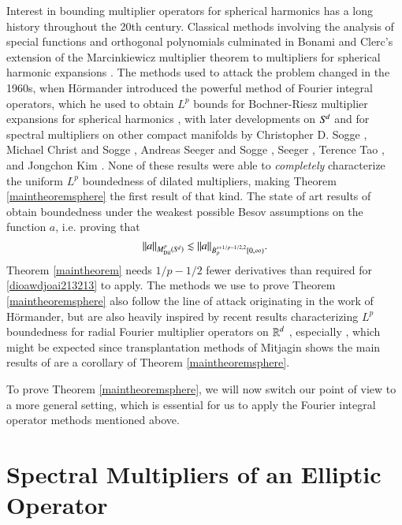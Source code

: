 Interest in bounding multiplier operators for spherical harmonics has a long history throughout the 20th century. Classical methods involving the analysis of special functions and orthogonal polynomials culminated in Bonami and Clerc's extension of the Marcinkiewicz multiplier theorem to multipliers for spherical harmonic expansions \cite{BonamiClerc}. The methods used to attack the problem changed in the 1960s, when H\"{o}rmander introduced the powerful method of Fourier integral operators, which he used to obtain $L^p$ bounds for Bochner-Riesz multiplier expansions for spherical harmonics \cite{HormanderRiesz}, with later developments on ${S}^{\!{d}}$ and for spectral multipliers on other compact manifolds by Christopher D. Sogge \cite{SoggeSpectralClusters,SoggeRieszMeans,SoggeSphericalHarmonics}, Michael Christ and Sogge \cite{ChristandSogge}, Andreas Seeger and Sogge \cite{SeegerSoggeBochnerRiesz}, Seeger \cite{SeegerEndpointEstimatesMultipliers}, Terence Tao \cite{Tao}, and Jongchon Kim \cite{KimSpectral}. None of these results were able to \emph{completely} characterize the uniform $L^p$ boundedness of dilated multipliers, making Theorem \ref{maintheoremsphere} the first result of that kind. The state of art results of \cite{KimSpectral} obtain boundedness under the weakest possible Besov assumptions on the function $a$, i.e. proving that
%
\begin{equation} \label{dioawdjoai213213}
  \| a \|_{M^p_{\text{Dil}}({S}^{\!{d}})} \lesssim \| a \|_{\dot{B}^{s+1/p - 1/2,2}_p[0,\infty)}.
\end{equation}
%
Theorem \ref{maintheorem} needs $1/p - 1/2$ fewer derivatives than required for \eqref{dioawdjoai213213} to apply. The methods we use to prove Theorem \ref{maintheoremsphere} also follow the line of attack originating in the work of H\"{o}rmander, but are also heavily inspired by recent results characterizing $L^p$ boundedness for radial Fourier multiplier operators on $\operatorname{\mathbb{R}}^d$ \cite{Cladek,GarrigosandSeeger,HeoandNazarovandSeeger,KimQuasiradial}, especially \cite{HeoandNazarovandSeeger}, which might be expected since transplantation methods of Mitjagin \cite{Mitjagin} shows the main results of \cite{HeoandNazarovandSeeger} are a corollary of Theorem \ref{maintheoremsphere}.

To prove Theorem \ref{maintheoremsphere}, we will now switch our point of view to a more general setting, which is essential for us to apply the Fourier integral operator methods mentioned above.

\section{Spectral Multipliers of an Elliptic Operator}

